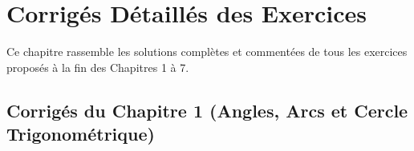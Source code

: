 \chapter{Corrigés Détaillés des Exercices}

Ce chapitre rassemble les solutions complètes et commentées de tous les exercices proposés à la fin des Chapitres 1 à 7.

\section{Corrigés du Chapitre 1 (Angles, Arcs et Cercle Trigonométrique)}

